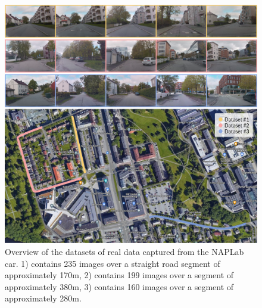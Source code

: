 \begin{figure}[h]
    \centering
    \includegraphics[width=1.0\textwidth]{figures/naplab-dataset.png}
    \caption{Overview of the datasets of real data captured from the NAPLab car. 1) contains 235 images over a straight road segment of approximately 170m, 2) contains 199 images over a segment of approximately 380m, 3) contains 160 images over a segment of approximately 280m.}
    \label{fig:naplab-dataset}
\end{figure}